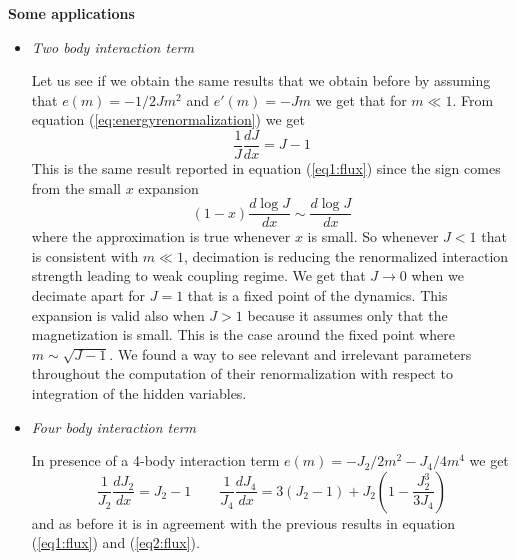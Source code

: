 \documentclass[aps,pre,noshowpacs]{revtex4}
\begin{document}
\textbf{Some applications} 
\begin{itemize}
\item \textit{Two body interaction term}

Let us see if we obtain the same results that we obtain before by assuming that
$e(m)=-1/2 J m^2$ and $e'(m)=-J m$ we get that for $m\ll 1$. From equation (\ref{eq:energyrenormalization}) we get 
\begin{equation}
\frac{1}{J}\frac{dJ}{dx}= J-1
\end{equation}
This is the same result reported in equation (\ref{eq1:flux}) since the sign comes from the
small $x$ expansion 
$$(1-x) \frac{d\log J}{d x} \sim   \frac{d\log J}{dx}$$
where the approximation is true whenever $x$ is small.
So whenever $J<1$ that is consistent with $m\ll 1$, decimation is reducing the renormalized interaction strength leading to weak coupling regime.
We get that $J \to 0$ when we decimate apart for $J=1$ that is a fixed point of the dynamics.
This expansion is valid also when $J>1$ because it assumes only that the magnetization is small. 
This is the case around the fixed point where $m\sim \sqrt{J-1}$. We found a way to see relevant and irrelevant parameters throughout the computation of their renormalization with respect to integration of the hidden variables.

\item \textit{Four body interaction term}

In presence of a 4-body interaction term $e(m)= -J_2/2 m^2-J_4/4 m^4$ we get
$$\frac{1}{J_2}\frac{dJ_2}{dx}= J_2-1 \qquad \frac{1}{J_4} \frac{dJ_4}{dx}= 3(J_2-1) + J_2(1-\frac{J_2^3}{3 J_4})$$
and as before it is in agreement with the previous results in equation (\ref{eq1:flux}) and (\ref{eq2:flux}). \end{itemize}
\end{document}

